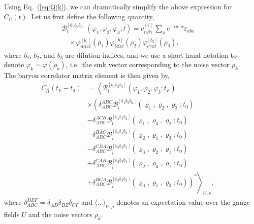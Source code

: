 Using Eq.~(\ref{eq:Qjk}), we can dramatically simplify the above expression for $C_{l\overline l}(t)$. Let us first define the following quantity,
\begin{equation}\label{eq:baryon_func}
    \begin{array}{l}
        \mathcal{B}_{l}^{\left[b_{1} b_{2} b_{3}\right]}\left(\varphi_{1}, \varphi_{2}, \varphi_{3} ; t\right)=c_{\alpha \beta \gamma}^{(l)} \sum_{x} e^{-i p \cdot x} \varepsilon_{a b c} \\
        \quad \times \varphi_{a \alpha x t}^{\left[b_{1}\right]}\left(\rho_{1}\right) \varphi_{b \beta x t}^{[b]}\left(\rho_{2}\right) \varphi_{c \gamma x t}^{\left[b_{3}\right]}\left(\rho_{3}\right),
        \end{array}
\end{equation}
where $b_1$, $b_2$, and $b_3$ are dilution indices, and we use a short-hand notation to denote $\varphi_k = \varphi(\rho_k)$, i.e.\ the sink vector corresponding to the noise vector $\rho_k$. The baryon correlator matrix element is then given by,
\begin{equation}\label{eq:corr_fac}
    \begin{aligned}
        C_{l \overline{l}}\left(t_{F}-t_{0}\right) &=\left\langle\mathcal{B}_{l}^{\left[b_{1} b_{2} b_{3}\right]}\left(\varphi_{1}, \varphi_{2}, \varphi_{3} ; t_{F}\right)\right.\\
        & \times\left(\delta_{A B C}^{\overline{A B C}} \mathcal{B}_{l}^{\left[b_{1} b_{2} b_{3}\right]}\left(\varrho_{1}, \varrho_{2}, \varrho_{3} ; t_{0}\right)\right.\\
        &-\delta_{A B C}^{\overline{A C B}} \mathcal{B}_{l}^{\left[b_{1} b_{3} b_{2}\right]}\left(\varrho_{1}, \varrho_{3}, \varrho_{2} ; t_{0}\right) \\
        &-\delta_{A B C}^{\overline{B A C}} \mathcal{B}_{\overline{l}}^{\left[b_{2} b_{1} b_{3}\right]}\left(\varrho_{2}, \varrho_{1}, \varrho_{3} ; t_{0}\right) \\
        &-\delta_{A B C}^{\overline{C B A}} \mathcal{B}_{\overline{l}}^{\left[b_{3} b_{2} b_{1}\right]}\left(\varrho_{3}, \varrho_{2}, \varrho_{1} ; t_{0}\right) \\
        &+\delta_{A B C}^{\overline{C A B}} \mathcal{B}_{\overline{l}}^{\left[b_{2} b_{3} b_{1}\right]}\left(\varrho_{2}, \varrho_{3}, \varrho_{1} ; t_{0}\right) \\
        &\left.\left.+\delta_{A B C}^{\overline{B C A}} \mathcal{B}_{\overline{l}}^{\left[b_{3} b_{1} b_{2}\right]}\left(\varrho_{3}, \varrho_{1}, \varrho_{2} ; t_{0}\right)\right)^{*}\right\rangle_{U, \rho},
    \end{aligned}
\end{equation}
where $\delta_{A B C}^{D E F}=\delta_{A D} \delta_{B E} \delta_{C F}$ and $\langle\ldots\rangle_{U, \rho}$ denotes an expectation value over the gauge fields $U$ and the noise vectors $\rho_k$.

